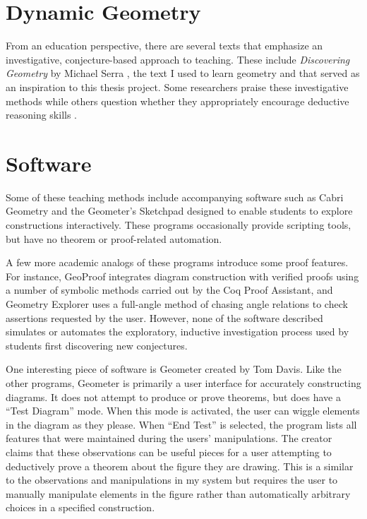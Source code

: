 \section{Dynamic Geometry}
From an education perspective, there are several texts that emphasize
an investigative, conjecture-based approach to teaching. These include
\emph{Discovering Geometry} by Michael Serra \cite{serraDiscovering},
the text I used to learn geometry and that served as an inspiration to
this thesis project.  Some researchers praise these investigative
methods \cite{geoTransformations} while others question whether they
appropriately encourage deductive reasoning skills \cite{geoTeaching}.

\section{Software}
Some of these teaching methods include accompanying software such as
Cabri Geometry \cite{cabri} and the Geometer's Sketchpad
\cite{geoSketchpad} designed to enable students to explore
constructions interactively.  These programs occasionally provide
scripting tools, but have no theorem or proof-related automation.

A few more academic analogs of these programs introduce some proof
features.  For instance, GeoProof \cite{geoProof} integrates diagram
construction with verified proofs using a number of symbolic methods
carried out by the Coq Proof Assistant, and Geometry Explorer
\cite{geoExplorer} uses a full-angle method of chasing angle relations
to check assertions requested by the user.  However, none of the
software described simulates or automates the exploratory, inductive
investigation process used by students first discovering new
conjectures.

One interesting piece of software is Geometer \cite{geometer} created
by Tom Davis. Like the other programs, Geometer is primarily a user
interface for accurately constructing diagrams. It does not attempt to
produce or prove theorems, but does have a ``Test Diagram'' mode. When
this mode is activated, the user can wiggle elements in the diagram as
they please. When ``End Test'' is selected, the program lists all
features that were maintained during the users' manipulations. The
creator claims that these observations can be useful pieces for a user
attempting to deductively prove a theorem about the figure they are
drawing. This is a similar to the observations and manipulations in my
system but requires the user to manually manipulate elements in the
figure rather than automatically arbitrary choices in a specified
construction.
